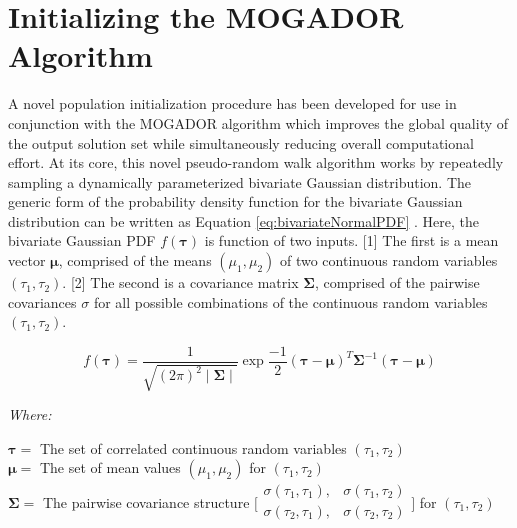 \section{Initializing the MOGADOR Algorithm}
    
A novel population initialization procedure has been developed for use in conjunction with the MOGADOR algorithm which improves the global quality of the output solution set while simultaneously reducing overall computational effort. At its core, this novel pseudo-random walk algorithm works by repeatedly sampling a dynamically parameterized bivariate Gaussian distribution. The generic form of the probability density function for the bivariate Gaussian distribution can be written as Equation \ref{eq:bivariateNormalPDF} \cite{Johnson2002}. Here, the bivariate Gaussian PDF $f(\boldsymbol{\tau})$ is function of two inputs. [1] The first is a mean vector $\boldsymbol{\mu}$, comprised of the means $(\mu_1, \mu_2)$ of two continuous random variables $(\tau_1, \tau_2)$. [2] The second is a covariance matrix $\boldsymbol{\Sigma}$, comprised of the pairwise covariances $\sigma$ for all possible combinations of the continuous random variables $(\tau_1, \tau_2)$.
            
            \begin{equation}
            f(\boldsymbol{\tau}) = \frac{1}{ \sqrt{ (2\pi)^2 \mid \boldsymbol{\Sigma} \mid} } \exp{ \frac{-1}{2} ( \boldsymbol{\tau} - \boldsymbol{\mu} )^T \boldsymbol{ \Sigma}^{-1} ( \boldsymbol{\tau} - \boldsymbol{\mu} ) }
            \label{eq:bivariateNormalPDF}
            \end{equation}

            \noindent \textit{Where:} \hfill

            \begin{center}
            $\boldsymbol{\tau} =$ The set of correlated continuous random variables $(\tau_1, \tau_2)$
            \\
            $\boldsymbol{\mu} = $ The set of mean values $(\mu_1, \mu_2)$ for $(\tau_1, \tau_2)$
            \\
            $\boldsymbol{\Sigma} =$ The pairwise covariance structure $\Biggl[\begin{matrix} \sigma(\tau_1,\tau_1), & \sigma(\tau_1,\tau_2) \\ \sigma(\tau_2,\tau_1), & \sigma(\tau_2,\tau_2) \\ \end{matrix}\Biggr]$ for $(\tau_{1}, \tau_{2})$
            \end{center}
            
